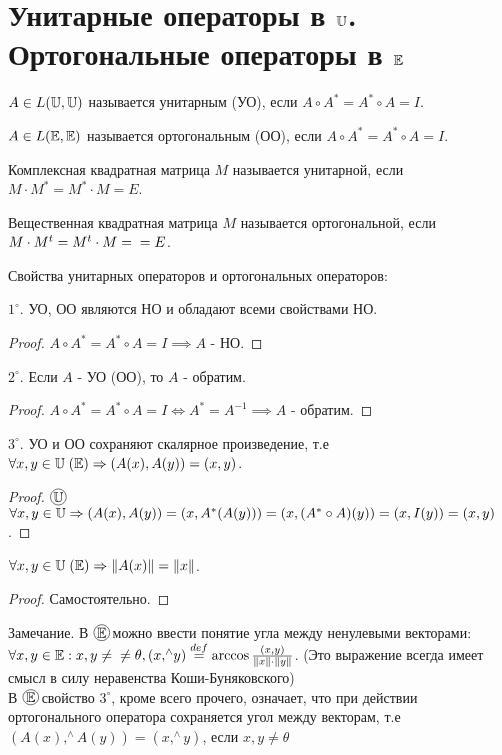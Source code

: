 \documentclass[../main.tex]{subfiles}
\begin{document}
\section{Унитарные операторы в $\mathbb{U}$. Ортогональные операторы в $\mathbb{E}$}
\begin{definition}
    $A \in L(\mathbb{U},\mathbb{U})$ называется унитарным (УО), если $A\circ A^{*} = A^{*} \circ A =  I$. 
\end{definition}
\begin{definition}
$A \in L(\mathbb{E},\mathbb{E})$ называется ортогональным (ОО), если $A\circ A^{*} = A^{*} \circ A = I$.    
\end{definition}
\begin{definition}
    Комплексная квадратная матрица $M$ называется унитарной, если $M \cdot M^{*} = M^{*} \cdot M = E$. 
\end{definition}
\begin{definition}
    Вещественная квадратная матрица $M$ называется ортогональной, если $M \cdot M^{t} = M^{t} \cdot M =\\= E$.
\end{definition}
Свойства унитарных операторов и ортогональных операторов:

$1^{\circ}$. УО, ОО являются НО и обладают всеми свойствами НО.
\begin{proof}
    $A \circ A^{*} = A^{*} \circ A = I \implies A$ - НО.
\end{proof}

$2^{\circ}$. Если $A$ - УО (ОО), то $A$ - обратим.
\begin{proof}
    $A \circ A^{*} = A^{*} \circ A = I \Leftrightarrow A^{*} = A^{-1} \implies A$ - обратим.
\end{proof}

$3^{\circ}$. УО и ОО сохраняют скалярное произведение, т.е $\forall x,y \in \mathbb{U} \; (\mathbb{E}) \Rightarrow (A(x),A(y)) = (x,y)$.
\begin{proof}
    $\tcircle{$\U$}$\; $\forall x,y \in \mathbb{U} \Rightarrow (A(x),A(y)) = (x,A^{*}(A(y))) = (x,(A^{*} \circ A)(y)) = (x,I(y)) = (x,y)$.
\end{proof}
\begin{corollary}
    $\forall x,y \in \mathbb{U} \; (\mathbb{E}) \Rightarrow \|A(x)\| = \|x\|$.
\end{corollary}
\begin{proof}
    Самостоятельно. 
\end{proof}
Замечание. В $\tcircle{$\E$}$\; можно ввести понятие угла между ненулевыми векторами: $\forall x,y \in \mathbb{E} : x,y \neq \\\neq  \theta , (x{,}^{\wedge} y)\overset{def}{=} \arccos{\frac{(x,y)}{\|x\|\cdot \|y\|}}$. (Это выражение всегда имеет смысл в силу неравенства Коши-Буняковского) 
\\В $\tcircle{$\E$}$ свойство $3^{\circ}$, кроме всего прочего, означает, что при действии ортогонального оператора сохраняется угол между векторам, т.е $(A(x){,}^{\wedge} A(y)) = (x{,}^{\wedge} y)$, если $x,y \neq \theta$
\end{document}
